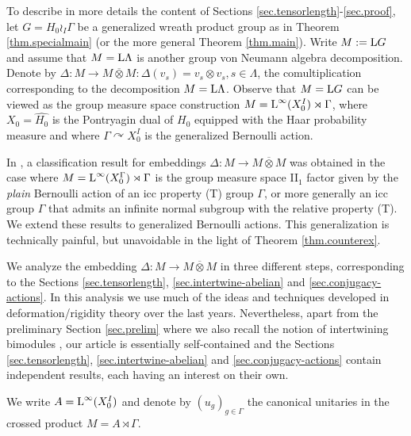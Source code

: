 \documentclass[a4paper,11pt]{amsart}
\numberwithin{equation}{section}
\begin{document}
To describe in more details the content of Sections \ref{sec.tensorlength}-\ref{sec.proof}, let $G =
H_0 \wr_I \Gamma$ be a generalized wreath product group as in
Theorem \ref{thm.specialmain} (or the more general Theorem
\ref{thm.main}). Write $M := {\mathord{\text{\rm L}}} G$ and assume that $M = {\mathord{\text{\rm L}}}
\Lambda$ is another group von Neumann algebra decomposition. Denote
by $\Delta : M {\rightarrow} M {\mathbin{\overline{\otimes}}} M : \Delta(v_s) = v_s {\otimes} v_s, s \in
\Lambda$, the comultiplication corresponding to the decomposition $M
= {\mathord{\text{\rm L}}} \Lambda$. Observe that $M = {\mathord{\text{\rm L}}} G$ can be viewed as the group
measure space construction $M = {\mathord{\text{\rm L}}}^\infty(X_0^I) \rtimes \Gamma$,
where $X_0 = \widehat{H_0}$ is the Pontryagin dual of $H_0$ equipped
with the Haar probability measure and where $\Gamma {\curvearrowright} X_0^I$
is the generalized Bernoulli action.

In \cite{Io10}, a classification result for embeddings $\Delta : M
{\rightarrow} M {\mathbin{\overline{\otimes}}} M$ was obtained in the case where $M =
{\mathord{\text{\rm L}}}^\infty(X_0^\Gamma) \rtimes \Gamma$ is the group measure space
II$_1$ factor given by the \emph{plain} Bernoulli action of an icc
property (T) group $\Gamma$, or more generally an icc group $\Gamma$
that admits an infinite normal subgroup with the relative property
(T). We extend these results to generalized Bernoulli actions. This
generalization is technically painful, but unavoidable in the light
of Theorem \ref{thm.counterex}.

We analyze the embedding $\Delta : M {\rightarrow} M {\mathbin{\overline{\otimes}}} M$ in three different steps, corresponding to the Sections \ref{sec.tensorlength}, \ref{sec.intertwine-abelian} and \ref{sec.conjugacy-actions}. In this analysis we use much of the ideas and techniques developed in deformation/rigidity theory over the last years. Nevertheless, apart
from the preliminary Section \ref{sec.prelim} where we also recall the notion of intertwining bimodules \cite{Po03}, our article is essentially self-contained and the Sections \ref{sec.tensorlength}, \ref{sec.intertwine-abelian} and \ref{sec.conjugacy-actions} contain independent results, each having an interest on their own.

We write $A = {\mathord{\text{\rm L}}}^\infty(X_0^I)$ and denote by $(u_g)_{g \in \Gamma}$ the canonical unitaries in the crossed product $M = A \rtimes \Gamma$.
\end{document}
